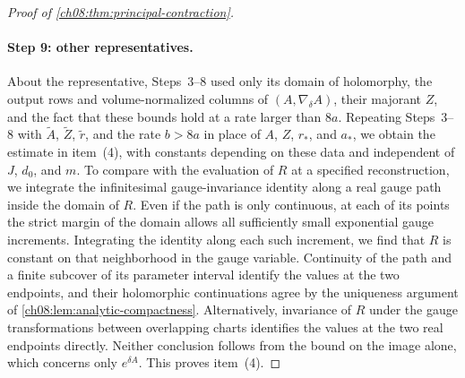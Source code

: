 \begin{proof}[Proof of \cref{ch08:thm:principal-contraction}]
\paragraph{Step 9: other representatives.}
About the representative, Steps~3--8 used only its domain of holomorphy, the output rows and volume-normalized columns of $(A,\nabla_\delta A)$, their majorant $Z$, and the fact that these bounds hold at a rate larger than $8a$. Repeating Steps~3--8 with $\widetilde A$, $\widetilde Z$, $\widetilde r$, and the rate $b>8a$ in place of $A$, $Z$, $r_*$, and $a_*$, we obtain the estimate in item~(4), with constants depending on these data and independent of $J$, $d_0$, and $m$. To compare with the evaluation of $R$ at a specified reconstruction, we integrate the infinitesimal gauge-invariance identity along a real gauge path inside the domain of $R$. Even if the path is only continuous, at each of its points the strict margin of the domain allows all sufficiently small exponential gauge increments. Integrating the identity along each such increment, we find that $R$ is constant on that neighborhood in the gauge variable. Continuity of the path and a finite subcover of its parameter interval identify the values at the two endpoints, and their holomorphic continuations agree by the uniqueness argument of \cref{ch08:lem:analytic-compactness}. Alternatively, invariance of $R$ under the gauge transformations between overlapping charts identifies the values at the two real endpoints directly. Neither conclusion follows from the bound on the image alone, which concerns only $e^{\delta A}$. This proves item~(4).
\end{proof}
